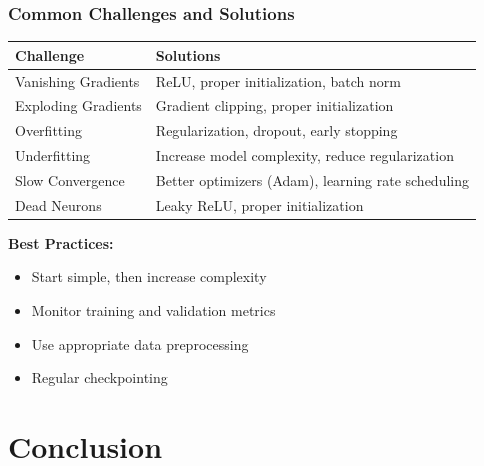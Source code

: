 \documentclass{beamer}
\begin{document}
\begin{frame}
\frametitle{Common Challenges and Solutions}
\begin{table}[h]
\centering
\begin{tabular}{|l|l|}
\hline
\textbf{Challenge} & \textbf{Solutions} \\
\hline
Vanishing Gradients & ReLU, proper initialization, batch norm \\
\hline
Exploding Gradients & Gradient clipping, proper initialization \\
\hline
Overfitting & Regularization, dropout, early stopping \\
\hline
Underfitting & Increase model complexity, reduce regularization \\
\hline
Slow Convergence & Better optimizers (Adam), learning rate scheduling \\
\hline
Dead Neurons & Leaky ReLU, proper initialization \\
\hline
\end{tabular}
\end{table}

\vspace{1em}

\textbf{Best Practices:}
\begin{itemize}
    \item Start simple, then increase complexity
    \item Monitor training and validation metrics
    \item Use appropriate data preprocessing
    \item Regular checkpointing
\end{itemize}
\end{frame}

\section{Conclusion}
\end{document}
